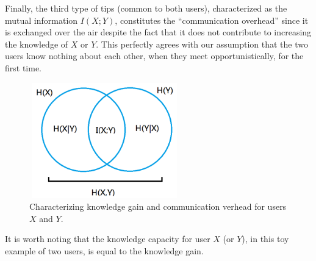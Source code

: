 \documentclass[conference]{IEEEtran}
\theoremstyle{definition}
\begin{document}
%
Finally, the third type of tips (common to both users), characterized as the mutual information $I(X;Y)$, constitutes the ``communication overhead'' since it is exchanged over the air despite the fact that it does not contribute to increasing the knowledge of $X$ or $Y$. This perfectly 
agrees with our assumption that the two users know nothing about each other, when they meet opportunistically, for the first time.
%
\begin{figure}[!tp]
  \centering
    \includegraphics[width=6.5cm ,height=5cm]{figures_png/vennSimple}
    \caption{Characterizing knowledge gain and communication verhead for users $X$ and $Y$.}\label{fig:KGEncounter}
    \end{figure}

It is worth noting that the knowledge capacity for user $X$ (or $Y$), in this toy example of two users, is equal to the knowledge gain. 
\vspace{-0.3 cm} 
\end{document}

